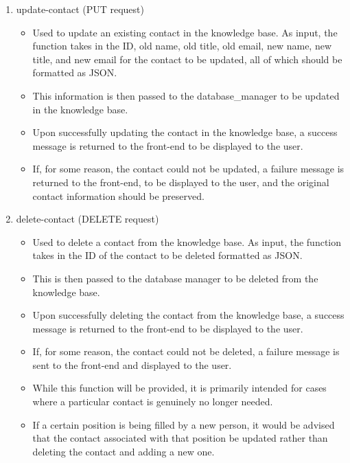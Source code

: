 \documentclass[titlepage, 12pt]{article}
\begin{document}
\begin{enumerate}
\begin{itemize}
    \end{itemize}
    \item update-contact (PUT request)
    \begin{itemize}
        \item Used to update an existing contact in the knowledge base. As input, the function takes in the ID, old name, old title, old email, new name, new title, and new email for the contact to be updated, all of which should be formatted as JSON.
        \item This information is then passed to the database\_manager to be updated in the knowledge base.
        \item Upon successfully updating the contact in the knowledge base, a success message is returned to the front-end to be displayed to the user.
        \item If, for some reason, the contact could not be updated, a failure message is returned to the front-end, to be displayed to the user, and the original contact information should be preserved.
    \end{itemize}
    \item delete-contact (DELETE request)
    \begin{itemize}
        \item Used to delete a contact from the knowledge base. As input, the function takes in the ID of the contact to be deleted formatted as JSON.
        \item This is then passed to the database manager to be deleted from the knowledge base.
        \item Upon successfully deleting the contact from the knowledge base, a success message is returned to the front-end to be displayed to the user.
        \item If, for some reason, the contact could not be deleted, a failure message is sent to the front-end and displayed to the user.
        \item While this function will be provided, it is primarily intended for cases where a particular contact is genuinely no longer needed.
        \item If a certain position is being filled by a new person, it would be advised that the contact associated with that position be updated rather than deleting the contact and adding a new one.
    \end{itemize}
\end{enumerate}
\end{document}
